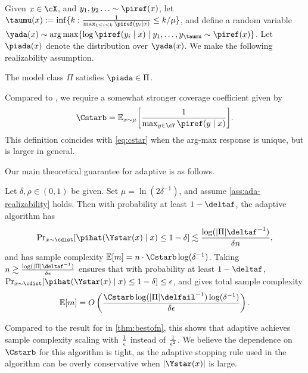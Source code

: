   Given $x\in\cX$, and $y_1,y_2\ldots\sim\piref(x)$, let
  $\taumu(x) := \inf \crl[big]{k : \frac{1}{\max_{1 \le i \le k}
      \piref(y_i\mid{}x)} \le k/\mu }$, and define a random variable 
  $\yada(x)\sim\argmax\crl*{\log\piref(y_i\mid{}x)\mid{}y_1,\ldots,y_{\taumu}\sim\piref(x)}$.
Let $\piada(x)$ denote the distribution over $\yada(x)$. We make the
following realizability assumption.
\begin{assumption}\label{ass:ada-realizability}
  The model class $\Pi$ satisfies $\piada\in\Pi$.
\end{assumption}
Compared to \bestofnalg, we require a somewhat stronger coverage
coefficient given by 
  \begin{align}
    \Cstarb = \En_{x\sim\mu}\brk*{\frac{1}{\max_{y\in\cY}\piref(y\mid{}x)}}.
  \end{align}
  This definition coincides with \cref{eq:cstar} when the arg-max
  response is unique, but is larger in general.\loose

Our main theoretical guarantee for adaptive \bestofnalg is as follows.
  \begin{theorem}
    \label{thm:bestofn_adaptive}
    Let $\delta,\rho\in (0,1)$ be given. Set $\mu =
    \ln(2\delta^{-1})$, and assume \cref{ass:ada-realizability}
    holds. Then with probability at least $1-\deltaf$, the adaptive \bestofnalg
    algorithm has
\begin{align}
  \Pr_{x \sim \cdist}[\pihat(\Ystar(x) \mid x) \leq 1 - \delta] \lesssim  \frac{\log(|\Pi|\deltaf^{-1})}{\delta n} ,
\end{align}
and has sample complexity $\En[m] = n\cdot\Cstarb
\log(\delta^{-1})$. Taking $n \gtrsim
\frac{\log(|\Pi|\deltaf^{-1})}{\delta \epsilon} $ ensures that with
probability at least $1-\deltaf$, $\Pr_{x \sim \cdist}[\pihat(\Ystar(x) \mid x) \leq 1 -
  \delta]\leq\eps$, and gives total sample complexity
\begin{align}
  \En\brk*{m} = O\left(\frac{\Cstarb\log(\abs{\Pi}\delfail^{-1})\log(\delta^{-1})}{\delta\eps}\right).
\end{align}
\end{theorem}
Compared to the result for \bestofnalg in \cref{thm:bestofn}, this
shows that adaptive \bestofnalg achieves sample complexity scaling
with $\frac{1}{\epsilon}$ instead of $\frac{1}{\epsilon^2}$. We believe the dependence on $\Cstarb$ for this algorithm
is tight, as the adaptive stopping rule used in the algorithm can be
overly conservative when $\abs{\Ystar(x)}$ is large.
\loose

